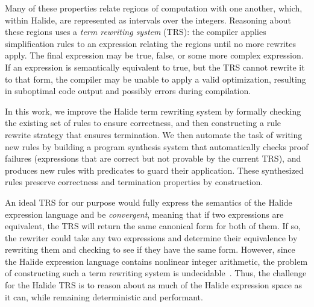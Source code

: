 \documentclass[acmsmall,review,anonymous]{acmart}\settopmatter{printfolios=true,printccs=false,printacmref=false}
\begin{document}
Many of these properties relate regions of computation with one another,
which, within Halide, are represented as intervals over the integers.
Reasoning about these regions uses a \textit{term rewriting system}
(TRS): the compiler applies simplification rules to an expression relating
the regions until no more rewrites apply.  The final expression may be
true, false, or some more complex expression. If an expression is semantically equivalent to true,
but the TRS cannot rewrite it to that form, the compiler may be unable to apply a valid optimization,
resulting in suboptimal code output and possibly errors during compilation.

In this work, we improve the Halide term rewriting system by formally checking the existing
set of rules to ensure correctness, and then constructing a rule rewrite strategy that 
ensures termination.  We then automate the task of writing new rules by building a program
synthesis system that automatically checks proof failures (expressions that are
correct but not provable by the current TRS), and produces new rules with predicates to guard their application.
These synthesized rules preserve correctness and termination properties by construction.

An ideal TRS for our purpose would fully express the semantics of the Halide
expression language and be \emph{convergent}, meaning that if two expressions
are equivalent, the TRS will return the same canonical form for both of them. If
so, the rewriter could take any two expressions and determine their equivalence
 by rewriting them and checking to see if they have the same form.
However, since the Halide expression language contains nonlinear integer
arithmetic, the problem of constructing such a term rewriting system is
undecidable~\cite{matiyasevich1993hilberts10th}. Thus, the challenge for the
Halide TRS is to reason about as much of the Halide expression space
as it can, while remaining deterministic and performant.

\end{document}
